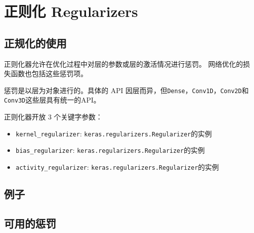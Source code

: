\section{正则化 Regularizers}\label{regularizers}
\subsection{正规化的使用}

正则化器允许在优化过程中对层的参数或层的激活情况进行惩罚。 网络优化的损失函数也包括这些惩罚项。

惩罚是以层为对象进行的。具体的 API 因层而异，但\texttt{Dense}，\texttt{Conv1D}，\texttt{Conv2D}和\texttt{Conv3D}这些层具有统一的API。

正则化器开放 3 个关键字参数：

\begin{itemize}
\tightlist
\item
  \texttt{kernel\_regularizer}:
  \texttt{keras.regularizers.Regularizer}的实例
\item
  \texttt{bias\_regularizer}:
  \texttt{keras.regularizers.Regularizer}的实例
\item
  \texttt{activity\_regularizer}:
  \texttt{keras.regularizers.Regularizer}的实例
\end{itemize}

\subsection{例子}\label{ux4f8bux5b50}

\begin{Shaded}
\begin{Highlighting}[]
  
\OperatorTok{=}\NormalTok{,}
                \OperatorTok{=}\NormalTok{),}
                \OperatorTok{=}\NormalTok{)))}
\end{Highlighting}
\end{Shaded}

\subsection{可用的惩罚}\label{ux53efux7528ux7684ux60e9ux7f5a}

\begin{Shaded}
\begin{Highlighting}[]
\end{Highlighting}
\end{Shaded}

